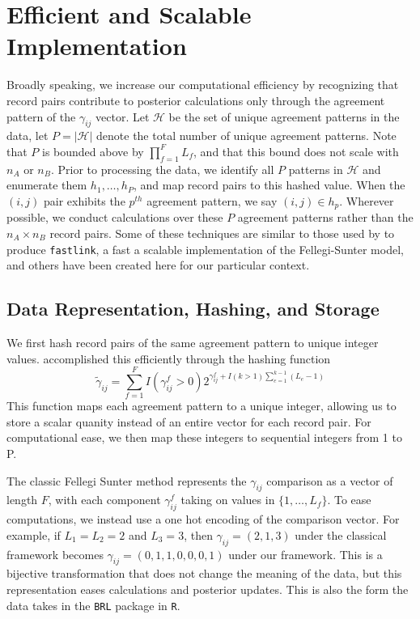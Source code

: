 \documentclass[12pt,letterpaper]{article}
\newcommand{\1}[1]{\mathbb{I}\!\left[#1\right]} %
\begin{document}
\section{Efficient and Scalable Implementation}
\label{sec:efficiency}
Broadly speaking, we increase our computational efficiency by
recognizing that record pairs contribute to posterior calculations only
through the agreement pattern of the \(\gamma_{ij}\) vector. Let
\(\mathcal{H}\) be the set of unique agreement patterns in the data, let
\(P = |\mathcal{H}|\) denote the total number of unique agreement
patterns.  Note that \(P\) is bounded above by \(\prod_{f=1}^F L_f\), and
that this bound does not scale with \(n_A\) or \(n_B\). Prior to
processing the data, we identify all \(P\) patterns in \(\mathcal{H}\)
and enumerate them \(h_1, \ldots, h_P\), and map record pairs to this hashed value. When the \((i,j)\) pair
exhibits the \(p^{th}\) agreement pattern, we say \((i,j) \in h_p\).
Wherever possible, we conduct calculations over these \(P\) agreement
patterns rather than the \(n_A \times n_B\) record pairs. Some of these techniques are similar to those used by \citep{enamorado2019} to produce \texttt{fastlink}, a fast a scalable implementation of the Fellegi-Sunter model, and others have been created here for our particular context. 

\hypertarget{data-representation-hashing-and-storage}{%
	\subsection{Data Representation, Hashing, and
		Storage}\label{data-representation-hashing-and-storage}}

We first hash record pairs of the same agreement pattern to unique integer values. \citep{enamorado2019} accomplished this efficiently through the hashing function
$$\tilde{\gamma}_{ij} = \sum_{f = 1}^F I(\gamma_{ij}^f > 0)2^{\gamma_{ij}^f + I(k>1)\sum_{e=1}^{k-1}(L_e -1)}$$
This function maps each agreement pattern to a unique integer, allowing us to store a scalar quanity instead of an entire vector for each record pair. For computational ease, we then map these integers to sequential integers from 1 to P. 

The classic Fellegi Sunter method represents the \(\gamma_{ij}\)
comparison as a vector of length \(F\), with each component
\(\gamma_{ij}^f\) taking on values in \(\{1, \ldots, L_f \}\). To ease
computations, we instead use a one hot encoding of the comparison vector. For example, if
\(L_1 = L_2 = 2\) and \(L_3 = 3\), then \(\gamma_{ij} = (2, 1, 3)\)
under the classical framework becomes
\(\gamma_{ij} = (0, 1, 1, 0, 0, 0, 1)\) under our framework. This is a
bijective transformation that does not change the meaning of the data,
but this representation eases calculations and posterior updates. This is also the form the data takes in the \texttt{BRL} package in \texttt{R}. 
\end{document}
